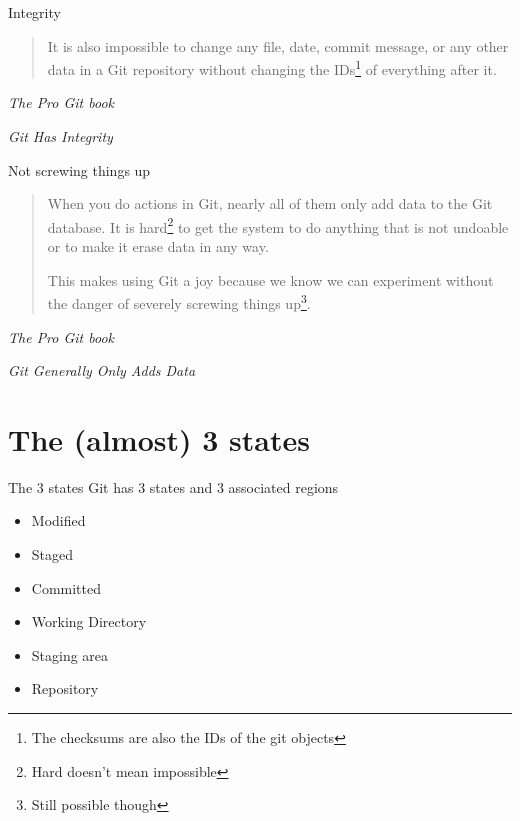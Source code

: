 \documentclass[10pt,aspectratio=169]{beamer}
\begin{document}
\begin{frame}[fragile]{Integrity}
    \begin{quote}
        It is also impossible to change any file, date, commit message, or any other data in a Git repository without changing the IDs\footnote{The checksums are also the IDs of the git objects} of everything after it.
    \end{quote}
    \begin{flushright}
        \textit{The Pro Git book}
    \end{flushright}

    \textit{Git Has Integrity}
\end{frame}

\begin{frame}[fragile]{Not screwing things up}
    \begin{quote}
        When you do actions in Git, nearly all of them only add data to the Git database. It is hard\footnote{Hard doesn't mean impossible} to get the system to do anything that is not undoable or to make it erase data in any way.

        This makes using Git a joy because we know we can experiment without the danger of severely screwing things up\footnote{Still possible though}.
    \end{quote}
    \begin{flushright}
        \textit{The Pro Git book}
    \end{flushright}

    \textit{Git Generally Only Adds Data}
\end{frame}

\section{The (almost) 3 states}

\begin{frame}[fragile]{The 3 states}
    Git has 3 states and 3 associated regions
    \begin{multicols}{2}
        \begin{itemize}
            \item Modified
            \item Staged
            \item Committed
            \item Working Directory
            \item Staging area
            \item Repository
        \end{itemize}
    \end{multicols}
\end{frame}
\end{document}
